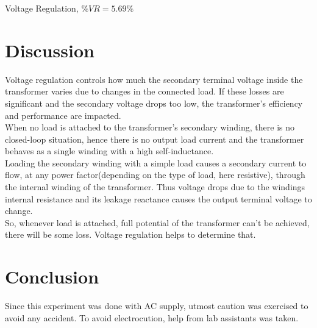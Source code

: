 \documentclass[12pt]{article}
\begin{document}
Voltage Regulation, \(\%V\!R = 5.69\%\)

\section{Discussion}
Voltage regulation controls how much the secondary terminal voltage inside the transformer varies due to changes in the connected load. If these losses are significant and the secondary voltage drops too low, the transformer's efficiency and performance are impacted.\\
When no load is attached to the transformer's secondary winding, there is no closed-loop situation, hence there is no output load current and the transformer behaves as a single winding with a high self-inductance.\\
Loading the secondary winding with a simple load causes a secondary current to flow, at any power factor(depending on the type of load, here resistive), through the internal winding of the transformer. Thus voltage drops due to the windings internal resistance and its leakage reactance causes the output terminal voltage to change.\\
So, whenever load is attached, full potential of the transformer can't be achieved, there will be some loss. Voltage regulation helps to determine that.

\section{Conclusion}
Since this experiment was done with AC supply, utmost caution was exercised to avoid any accident. To avoid electrocution, help from lab assistants was taken.


\end{document}
